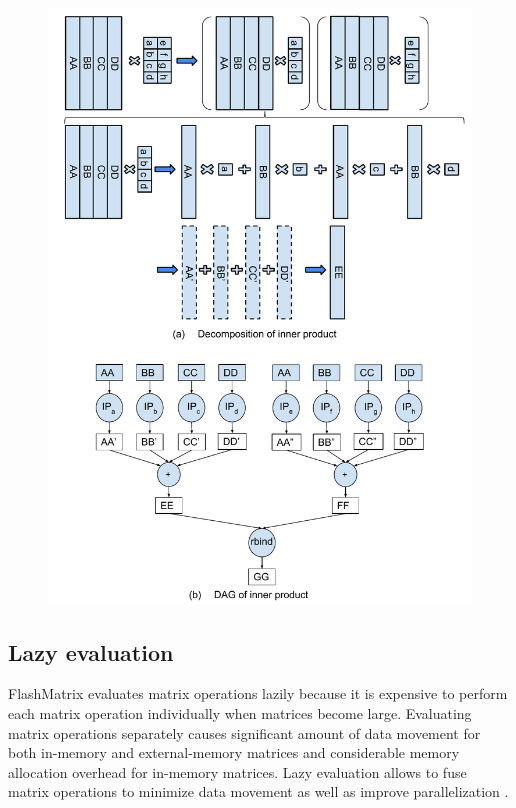 \begin{figure}
\centering
\includegraphics[scale=0.4]{./inner_prod_tall.pdf}
\vspace{-5pt}
\caption{}
\vspace{-5pt}
\label{fig:inner_prod}
\end{figure}


\subsection{Lazy evaluation} \label{sec:lazy_eval}
FlashMatrix evaluates matrix operations lazily because it is expensive to
perform each matrix operation individually when matrices become large.
Evaluating matrix operations separately causes significant amount of data
movement for both in-memory and external-memory matrices and considerable
memory allocation overhead for in-memory matrices. Lazy evaluation allows
to fuse matrix operations to minimize data movement as well as improve
parallelization \cite{Ching12}.


